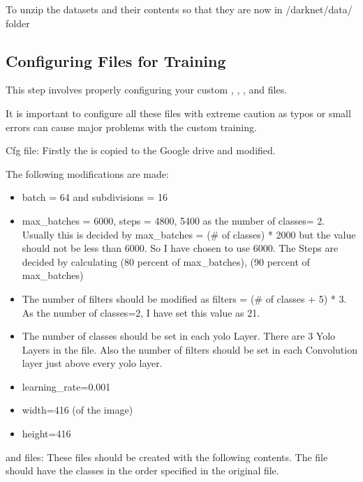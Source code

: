 
To unzip the datasets and their contents so that they are now in /darknet/data/ folder



\subsection{Configuring Files for Training}

This step involves properly configuring your custom , , ,  and  files.

It is important to configure all these files with extreme caution as typos or small errors can cause major problems with the custom training.

Cfg file: Firstly the  is copied to the Google drive and modified. 

The following modifications are made: 

\begin{itemize}
	\item batch = 64 and subdivisions = 16
	\item max{\_}batches = 6000, steps = 4800, 5400 as the number of classes= 2. Usually this is decided by max{\_}batches = (\# of classes) * 2000 but the value should not be less than 6000. So I have chosen to use 6000. The Steps are decided by calculating (80 percent of max{\_}batches), (90 percent of max{\_}batches)
	\item The number of filters should be modified as filters = (\# of classes + 5) * 3. As the number of classes=2, I have set this value as 21. 
	\item The number of classes should be set in each \ac{yolo} Layer. There are 3 Yolo Layers in the  file. Also the number of filters should be set in each Convolution layer just above every yolo layer.
	\item learning{\_}rate=0.001
	\item width=416 (of the image)
	\item height=416 
\end{itemize}

 and  files: 
These files should be created with the following contents. 
The  file should have the classes in the order specified in the original  file.

